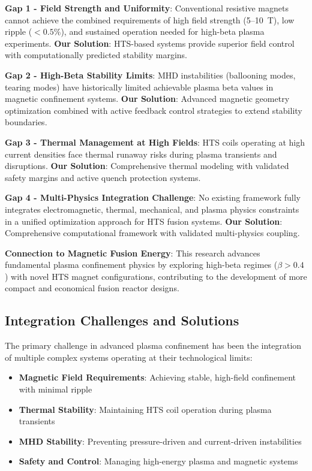 \documentclass[10pt,twocolumn]{article}
\begin{document}
\textbf{Gap 1 - Field Strength and Uniformity}: Conventional resistive magnets cannot achieve the combined requirements of high field strength (5--10~T), low ripple ($<0.5\%$), and sustained operation needed for high-beta plasma experiments. \textbf{Our Solution}: HTS-based systems provide superior field control with computationally predicted stability margins.

\textbf{Gap 2 - High-Beta Stability Limits}: MHD instabilities (ballooning modes, tearing modes) have historically limited achievable plasma beta values in magnetic confinement systems. \textbf{Our Solution}: Advanced magnetic geometry optimization combined with active feedback control strategies to extend stability boundaries.

\textbf{Gap 3 - Thermal Management at High Fields}: HTS coils operating at high current densities face thermal runaway risks during plasma transients and disruptions. \textbf{Our Solution}: Comprehensive thermal modeling with validated safety margins and active quench protection systems.

\textbf{Gap 4 - Multi-Physics Integration Challenge}: No existing framework fully integrates electromagnetic, thermal, mechanical, and plasma physics constraints in a unified optimization approach for HTS fusion systems. \textbf{Our Solution}: Comprehensive computational framework with validated multi-physics coupling.

\textbf{Connection to Magnetic Fusion Energy}: This research advances fundamental plasma confinement physics by exploring high-beta regimes ($\beta > 0.4$) with novel HTS magnet configurations, contributing to the development of more compact and economical fusion reactor designs.

\subsection{Integration Challenges and Solutions}

The primary challenge in advanced plasma confinement has been the integration of multiple complex systems operating at their technological limits:
\begin{itemize}
\item \textbf{Magnetic Field Requirements}: Achieving stable, high-field confinement with minimal ripple
\item \textbf{Thermal Stability}: Maintaining HTS coil operation during plasma transients
\item \textbf{MHD Stability}: Preventing pressure-driven and current-driven instabilities
\item \textbf{Safety and Control}: Managing high-energy plasma and magnetic systems
\end{itemize}
\end{document}
